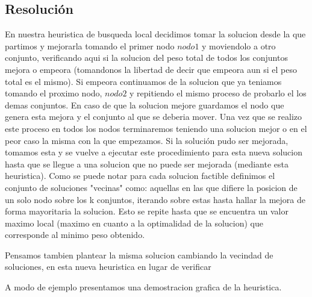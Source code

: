 \subsection{Resoluci\'on}

En nuestra heuristica de busqueda local decidimos tomar la solucion desde la que partimos y mejorarla tomando el primer nodo $nodo1$ y moviendolo a otro conjunto, verificando aqui si la solucion del peso total de todos los conjuntos mejora o empeora (tomandonos la libertad de decir que empeora aun si el peso total es el mismo). Si empeora continuamos de la solucion que ya teniamos tomando el proximo nodo, $nodo2$ y repitiendo el mismo proceso de probarlo el los demas conjuntos. En caso de que la solucion mejore guardamos el nodo que genera esta mejora y el conjunto al que se deberia mover. Una vez que se realizo este proceso en todos los nodos terminaremos teniendo una solucion mejor o en el peor caso la misma con la que empezamos.
Si la solución pudo ser mejorada, tomamos esta y se vuelve a ejecutar este procedimiento para esta nueva solucion hasta que se llegue a una solucion que no puede ser mejorada (mediante esta heuristica).
Como se puede notar para cada solucion factible definimos el conjunto de soluciones "vecinas" como: aquellas en las que difiere la posicion de un solo nodo sobre los k conjuntos, iterando sobre estas hasta hallar la mejora de forma mayoritaria la solucion. Esto se repite hasta que se encuentra un valor maximo local (maximo en cuanto a la optimalidad de la solucion) que corresponde al minimo peso obtenido.

Pensamos tambien plantear la misma solucion cambiando la vecindad de soluciones, en esta nueva heuristica en lugar de verificar

A modo de ejemplo presentamos una demostracion grafica de la heuristica.


